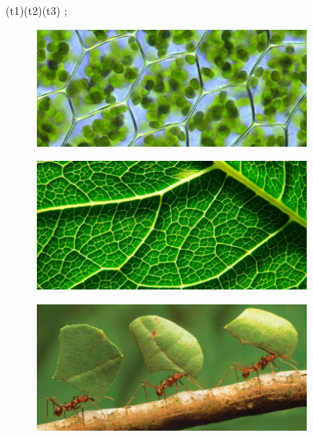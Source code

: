 \documentclass[a4paper,11pt]{book}
\theoremstyle{definition}
\newif\ifen
\newif\ifes
\newcommand{\En}[1]{\ifen#1\fi}
\newcommand{\Es}[1]{\ifes#1\fi}
\begin{document}
\begin{figure}[ht!]
{{       {(t1)(t2)(t3)} {}; %
      }
  }

  \vspace{0.2cm}

 \begin{subfigure}[b]{0.25\textwidth} \centering
  \includegraphics[width=\linewidth]{static/cloroplastos.jpg}
  \caption*{\En{Eukaryotic cells}}
  \end{subfigure}
 \begin{subfigure}[b]{0.23\textwidth} \centering
  \includegraphics[width=\linewidth]{static/fotosintesis.jpg}
  \caption*{\En{Organisms}}
  \end{subfigure}
  \begin{subfigure}[b]{0.235\textwidth} \centering
 \includegraphics[width=\linewidth]{static/hormigas2.jpg}

\end{subfigure}
\end{figure}
\end{document}
